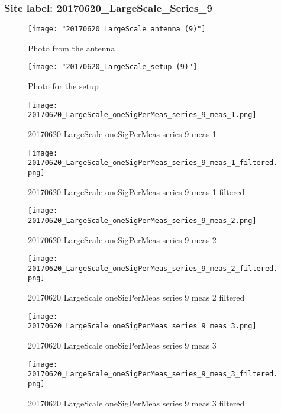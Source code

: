 \subsubsection{Site label: 20170620\_LargeScale\_Series\_9}
\begin{figure}[ht] \caption{Photo from the antenna}
\texttt{[image: "20170620\_LargeScale\_antenna (9)"]}\centering\end{figure}
\begin{figure}[ht] \caption{Photo for the setup}
\texttt{[image: "20170620\_LargeScale\_setup (9)"]}\centering\end{figure}
\begin{figure}[ht] \caption{20170620 LargeScale oneSigPerMeas series 9 meas 1}
\texttt{[image: 20170620\_LargeScale\_oneSigPerMeas\_series\_9\_meas\_1.png]}\centering\end{figure}
\begin{figure}[ht] \caption{20170620 LargeScale oneSigPerMeas series 9 meas 1 filtered}
\texttt{[image: 20170620\_LargeScale\_oneSigPerMeas\_series\_9\_meas\_1\_filtered.png]}\centering\end{figure}
\begin{figure}[ht] \caption{20170620 LargeScale oneSigPerMeas series 9 meas 2}
\texttt{[image: 20170620\_LargeScale\_oneSigPerMeas\_series\_9\_meas\_2.png]}\centering\end{figure}
\begin{figure}[ht] \caption{20170620 LargeScale oneSigPerMeas series 9 meas 2 filtered}
\texttt{[image: 20170620\_LargeScale\_oneSigPerMeas\_series\_9\_meas\_2\_filtered.png]}\centering\end{figure}
\begin{figure}[ht] \caption{20170620 LargeScale oneSigPerMeas series 9 meas 3}
\texttt{[image: 20170620\_LargeScale\_oneSigPerMeas\_series\_9\_meas\_3.png]}\centering\end{figure}
\begin{figure}[ht] \caption{20170620 LargeScale oneSigPerMeas series 9 meas 3 filtered}
\texttt{[image: 20170620\_LargeScale\_oneSigPerMeas\_series\_9\_meas\_3\_filtered.png]}\centering\end{figure}
\clearpage
